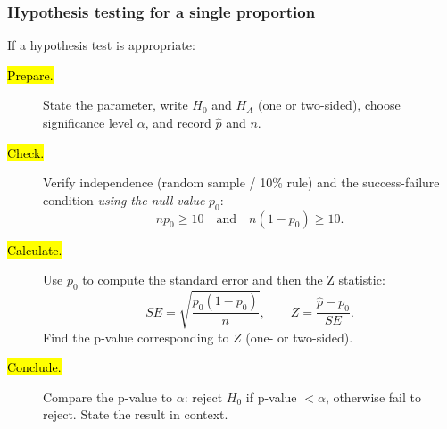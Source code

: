 \documentclass[t,compress,mathserif]{beamer}
\begin{document}
\begin{frame}
\frametitle{Hypothesis testing for a single proportion}

If a hypothesis test is appropriate:

\begin{small}
\begin{description}
  \item[\hl{Prepare.}] State the parameter, write $H_0$ and $H_A$ (one or two-sided), choose significance level $\alpha$, and record $\hat{p}$ and $n$.
  \item[\hl{Check.}] Verify independence (random sample / 10\% rule) and the success-failure condition \emph{using the null value} $p_0$: \[
    np_0 \ge 10 \quad\text{and}\quad n(1-p_0)\ge 10.
  \]
  \item[\hl{Calculate.}] Use $p_0$ to compute the standard error and then the Z statistic:
  \[
    SE = \sqrt{\dfrac{p_0(1-p_0)}{n}}, \qquad
    Z=\dfrac{\hat{p}-p_0}{SE}.
  \]
  Find the p-value corresponding to $Z$ (one- or two-sided).
  \item[\hl{Conclude.}] Compare the p-value to $\alpha$: reject $H_0$ if p-value $<\alpha$, otherwise fail to reject. State the result in context.
\end{description}
\end{small}
\end{frame}

\end{document}
